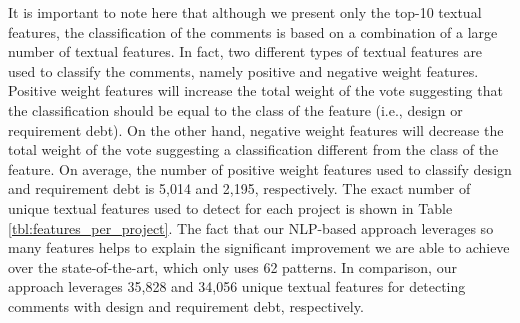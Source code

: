 It is important to note here that although we present only the top-10 textual features, the classification of the comments is based on a combination of a large number of textual features. In fact, two different types of textual features are used to classify the comments, namely positive and negative weight features. Positive weight features will increase the total weight of the vote suggesting that the classification should be equal to the class of the feature (i.e., design or requirement debt). On the other hand, negative weight features will decrease the total weight of the vote suggesting a classification different from the class of the feature. On average, the number of positive weight features used to classify design and requirement debt is 5,014 and 2,195, respectively. The exact number of unique textual features used to detect \SATD for each project is shown in Table \ref{tbl:features_per_project}. The fact that our NLP-based approach leverages so many features helps to explain the significant improvement we are able to achieve over the state-of-the-art, which only uses 62 patterns. In comparison, our approach leverages 35,828 and 34,056 unique textual features for detecting comments with design and requirement debt, respectively.

